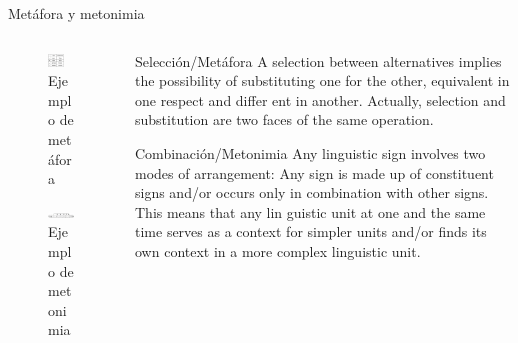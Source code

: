 \documentclass[presentation]{beamer}
\begin{document}
\begin{frame}[label={sec:orga11ca70}]{Metáfora y metonimia}
\begin{columns}
\begin{column}{0.48\columnwidth}
\begin{figure}
    \includegraphics[width=0.6\textwidth]{./assets/ejemplo_metafora.png}
\caption{Ejemplo de metáfora}
 \end{figure}

 \begin{figure}
    \includegraphics[width=\textwidth]{./assets/ejemplo_metonimia.png}
\caption{Ejemplo de metonimia}
 \end{figure}
\end{column}


\begin{column}{0.48\columnwidth}
\tiny

      \begin{block}{Selección/Metáfora}
A selection between alternatives implies the possibility
of substituting one for the other, equivalent in one respect and differ­
ent in another. Actually, selection and substitution are two faces of the
same operation. \cite[p.98]{jakobson1956two}


   \end{block}

   \begin{block}{Combinación/Metonimia}
Any linguistic sign involves two modes of arrangement: Any sign is made up of constituent signs and/or
occurs only in combination with other signs. This means that any lin­
guistic unit at one and the same time serves as a context for simpler
units and/or finds its own context in a more complex linguistic unit.
\cite[p.99]{jakobson1956two}
   \end{block}



\normalsize
\end{column}
\end{columns}
\end{frame}
\end{document}
